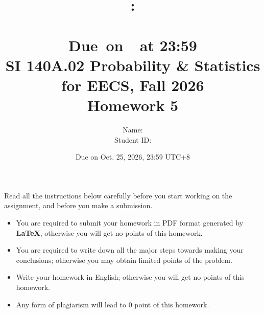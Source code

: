 \documentclass[a4paper]{article}
\title{
    \vspace{2in}
    \textmd{\textbf{\hmwkClass:\\  \hmwkTitle}}\\
    \normalsize\vspace{0.1in}\small{Due\ on\ \hmwkDueDate\ at 23:59}\\
	\vspace{4in}
}
\author{
	Name: \textbf{\hmwkAuthorName} \\
	Student ID: \hmwkAuthorID}
\date{}
\begin{document}

\date{
Due on Oct. 25, 2026, 23:59 UTC+8}
\title{SI 140A.02  Probability \& Statistics for EECS, Fall 2026 \\
Homework 5}
\maketitle
Read all the instructions below carefully before you start working on the assignment, and before you make a submission.
\begin{itemize}
    \item You are required to submit your homework in PDF format generated by \textbf{LaTeX}, otherwise you will get no points of this homework.
    \item You are required to write down all the major steps towards making your conclusions; otherwise you may obtain limited points of the problem.
    \item Write your homework in English; otherwise you will get no points of this homework.
    \item Any form of plagiarism will lead to $0$ point of this homework. 
\end{itemize}
\newpage
\end{document}
